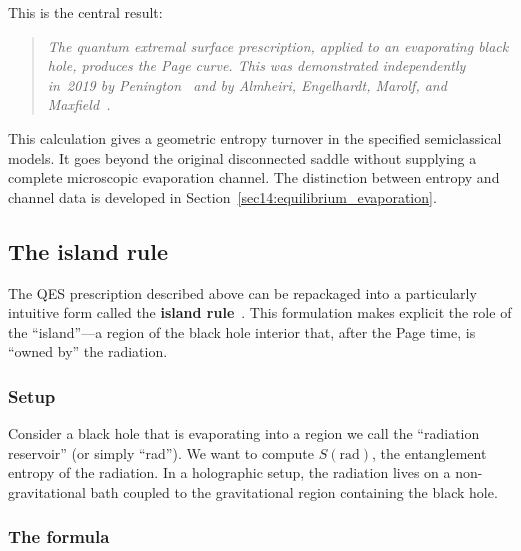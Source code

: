 \documentclass[11pt,letterpaper]{article}
\theoremstyle{plain}
\theoremstyle{definition}
\theoremstyle{remark}
\begin{document}
This is the central result:
\begin{quote}
\emph{The quantum extremal surface prescription, applied to an
evaporating black hole, produces the Page curve.  This was
demonstrated independently in~2019 by
Penington~\citeyearpar{penington2020} and by Almheiri, Engelhardt,
Marolf, and Maxfield~\citeyearpar{almheirietal2019}.}
\end{quote}

This calculation gives a geometric entropy turnover in the specified
semiclassical models. It goes beyond the original disconnected saddle
without supplying a complete microscopic evaporation channel.
The distinction between entropy and channel data is developed in
Section~\ref{sec14:equilibrium_evaporation}.

\subsection{The island rule}
\label{subsec04:island}

The QES prescription described above can be repackaged into a
particularly intuitive form called the \textbf{island
rule}~\citep{almheirietal2020islands}.  This formulation makes
explicit the role of the ``island''---a region of the black hole
interior that, after the Page time, is ``owned by'' the radiation.

\subsubsection*{Setup}

Consider a black hole that is evaporating into a region we call the
``radiation reservoir'' (or simply ``rad'').  We want to compute
$S(\mathrm{rad})$, the entanglement entropy of the radiation.  In a
holographic setup, the radiation lives on a non-gravitational bath
coupled to the gravitational region containing the black hole.

\subsubsection*{The formula}
\end{document}
